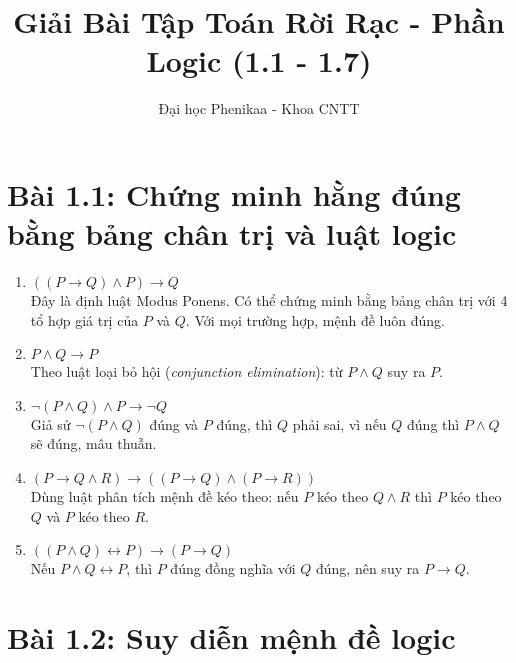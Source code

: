 \documentclass[12pt]{article}
\title{Giải Bài Tập Toán Rời Rạc - Phần Logic (1.1 - 1.7)}
\author{Đại học Phenikaa - Khoa CNTT}
\date{}
\begin{document}
\maketitle

\section*{Bài 1.1: Chứng minh hằng đúng bằng bảng chân trị và luật logic}

\begin{enumerate}
    \item $((P \rightarrow Q) \land P) \rightarrow Q$\\
    Đây là định luật Modus Ponens. Có thể chứng minh bằng bảng chân trị với 4 tổ hợp giá trị của $P$ và $Q$. Với mọi trường hợp, mệnh đề luôn đúng.
    
    \item $P \land Q \rightarrow P$\\
    Theo luật loại bỏ hội (\textit{conjunction elimination}): từ $P \land Q$ suy ra $P$.

    \item $\neg(P \land Q) \land P \rightarrow \neg Q$\\
    Giả sử $\neg(P \land Q)$ đúng và $P$ đúng, thì $Q$ phải sai, vì nếu $Q$ đúng thì $P \land Q$ sẽ đúng, mâu thuẫn.

    \item $(P \rightarrow Q \land R) \rightarrow ((P \rightarrow Q) \land (P \rightarrow R))$\\
    Dùng luật phân tích mệnh đề kéo theo: nếu $P$ kéo theo $Q \land R$ thì $P$ kéo theo $Q$ và $P$ kéo theo $R$.

    \item $((P \land Q) \leftrightarrow P) \rightarrow (P \rightarrow Q)$\\
    Nếu $P \land Q \leftrightarrow P$, thì $P$ đúng đồng nghĩa với $Q$ đúng, nên suy ra $P \rightarrow Q$.
\end{enumerate}

\section*{Bài 1.2: Suy diễn mệnh đề logic}
\end{document}
